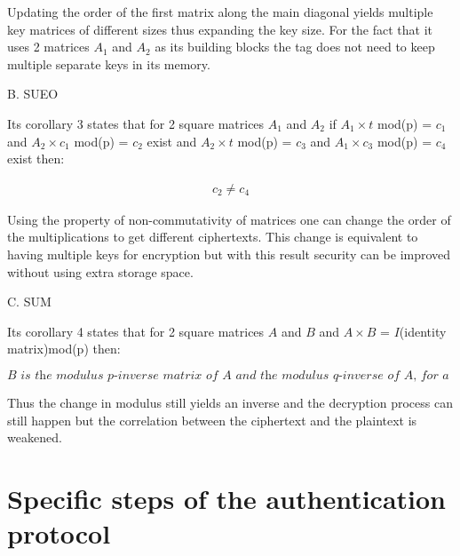     Updating the order of the first matrix along the main diagonal yields multiple key matrices of different sizes thus expanding the key size. For the fact that it uses 2 matrices $A_1$ and
    $A_2$ as its building blocks the tag does not need to keep multiple separate keys in its memory.

\vspace{0.5cm}
\hspace{1cm}
    B. SUEO

    Its corollary 3 states that for 2 square matrices $A_1$ and $A_2$ if $A_1 \times t$ mod(p) = $c_1$ and $A_2 \times c_1$ mod(p) = $c_2$ exist and $A_2 \times t$ mod(p) = $c_3$ and 
    $A_1 \times c_3$ mod(p) = $c_4$ exist then: 
    
    \begin{gather}
        c_2 \neq c_4
    \end{gather}

    Using the property of non-commutativity of matrices one can change the order of the multiplications to get different ciphertexts. This change is equivalent to having multiple keys for
    encryption but with this result security can be improved without using extra storage space.

\vspace{0.5cm}
\hspace{1cm}
    C. SUM

    Its corollary 4 states that for 2 square matrices $A$ and $B$ and $A \times B$ = $I$(identity matrix)mod(p) then: 
    
    \begin{equation}
        \textit{B is the modulus p-inverse matrix of A and the modulus q-inverse of A, for a q integer divisor of p.} \tag{3}
    \end{equation}

    Thus the change in modulus still yields an inverse and the decryption process can still happen but the correlation between the ciphertext and the plaintext is weakened.

\section{Specific steps of the authentication protocol}

